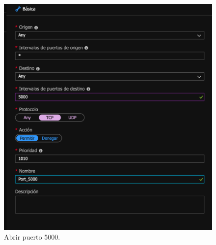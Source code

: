 \documentclass[english,runningheads,a4paper]{llncs}[2018/03/10]
\begin{document}
\begin{figure}[h!]
 \includegraphics[width=\linewidth]{./Web/Azure/Azure2.png}
 \caption{Abrir puerto 5000.}
\end{figure}
\end{document}

